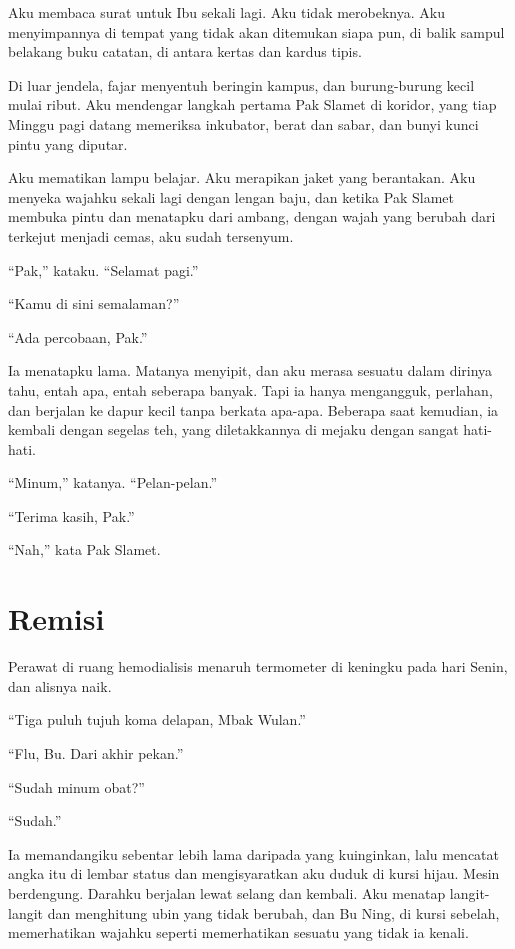 \documentclass[11pt,twoside,openany]{book}
\begin{document}
Aku membaca surat untuk Ibu sekali lagi. Aku tidak merobeknya. Aku menyimpannya di tempat yang tidak akan ditemukan siapa pun, di balik sampul belakang buku catatan, di antara kertas dan kardus tipis.

Di luar jendela, fajar menyentuh beringin kampus, dan burung-burung kecil mulai ribut. Aku mendengar langkah pertama Pak Slamet di koridor, yang tiap Minggu pagi datang memeriksa inkubator, berat dan sabar, dan bunyi kunci pintu yang diputar.

Aku mematikan lampu belajar. Aku merapikan jaket yang berantakan. Aku menyeka wajahku sekali lagi dengan lengan baju, dan ketika Pak Slamet membuka pintu dan menatapku dari ambang, dengan wajah yang berubah dari terkejut menjadi cemas, aku sudah tersenyum.

``Pak,'' kataku. ``Selamat pagi.''

``Kamu di sini semalaman?''

``Ada percobaan, Pak.''

Ia menatapku lama. Matanya menyipit, dan aku merasa sesuatu dalam dirinya tahu, entah apa, entah seberapa banyak. Tapi ia hanya mengangguk, perlahan, dan berjalan ke dapur kecil tanpa berkata apa-apa. Beberapa saat kemudian, ia kembali dengan segelas teh, yang diletakkannya di mejaku dengan sangat hati-hati.

``Minum,'' katanya. ``Pelan-pelan.''

``Terima kasih, Pak.''

``Nah,'' kata Pak Slamet.

\chapter{Remisi}
Perawat di ruang hemodialisis menaruh termometer di keningku pada hari Senin, dan alisnya naik.

``Tiga puluh tujuh koma delapan, Mbak Wulan.''

``Flu, Bu. Dari akhir pekan.''

``Sudah minum obat?''

``Sudah.''

Ia memandangiku sebentar lebih lama daripada yang kuinginkan, lalu mencatat angka itu di lembar status dan mengisyaratkan aku duduk di kursi hijau. Mesin berdengung. Darahku berjalan lewat selang dan kembali. Aku menatap langit-langit dan menghitung ubin yang tidak berubah, dan Bu Ning, di kursi sebelah, memerhatikan wajahku seperti memerhatikan sesuatu yang tidak ia kenali.
\end{document}
